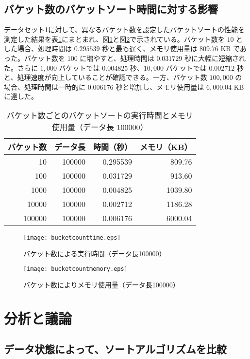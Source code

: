 \documentclass[a4j, 12pt]{jarticle}
\begin{document}
\subsection{バケット数のバケットソート時間に対する影響}
データセット1に対して、異なるバケット数を設定したバケットソートの性能を測定した結果を表\ref{bucketcountresult}にまとまれ、図\ref{bucketcounttimegraph}と図\ref{bucketcountmemorygraph}で示されている。バケット数を $10$ とした場合、処理時間は $0.295539$ 秒と最も遅く、メモリ使用量は $809.76$ KB であった。バケット数を $100$ に増やすと、処理時間は $0.031729$ 秒に大幅に短縮された。さらに $1,000$ バケットでは $0.004825$ 秒、$10,000$ バケットでは $0.002712$ 秒と、処理速度が向上していることが確認できる。一方、バケット数 $100,000$ の場合、処理時間は一時的に $0.006176$ 秒と増加し、メモリ使用量は $6,000.04$ KB に達した。
\begin{table}[H]
  \centering
  \caption{バケット数ごとのバケットソートの実行時間とメモリ使用量（データ長 100000）}\label{bucketcountresult}
  \begin{tabular}{|r|r|r|r|}
    \hline
    \textbf{バケット数} & \textbf{データ長} & \textbf{時間（秒）} & \textbf{メモリ（KB）} \\
    \hline
    10      & 100000 & 0.295539 & 809.76  \\
    100     & 100000 & 0.031729 & 913.60  \\
    1000    & 100000 & 0.004825 & 1039.80 \\
    10000   & 100000 & 0.002712 & 1186.28 \\
    100000  & 100000 & 0.006176 & 6000.04 \\
    \hline
  \end{tabular}
\end{table}
\begin{figure}[H]
  \centering
  \texttt{[image: bucketcounttime.eps]}
  \caption{バケット数による実行時間（データ長100000）}\label{bucketcounttimegraph}
\end{figure}
\begin{figure}[H]
  \centering
  \texttt{[image: bucketcountmemory.eps]}
  \caption{バケット数によりメモリ使用量（データ長100000）}\label{bucketcountmemorygraph}
\end{figure}
\section{分析と議論}
\subsection{データ状態によって、ソートアルゴリズムを比較}
\end{document}
